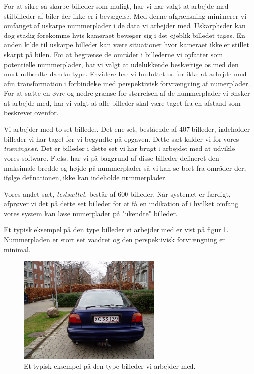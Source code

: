 For at sikre så skarpe billeder som muligt, har vi har valgt at arbejde med stilbilleder af biler der ikke er i bevægelse. Med denne afgrænsning minimerer vi omfanget af uskarpe nummerplader i de data vi arbejder med. Uskarpheder kan dog stadig forekomme hvis kameraet bevæger sig i det øjeblik billedet tages. En anden kilde til uskarpe billeder kan være situationer hvor kameraet ikke er stillet skarpt på bilen. For at begrænse de områder i billederne vi opfatter som potentielle nummerplader, har vi valgt at udelukkende beskæftige os med den mest udbredte danske type. Envidere har vi besluttet os for ikke at arbejde med afin transformation i forbindelse med perspektivisk forvrængning af numerplader. For at sætte en øvre og nedre grænse for størrelsen af de nummerplader vi ønsker at arbejde med, har vi valgt at alle billeder skal være taget fra en afstand som beskrevet ovenfor. 

Vi arbejder med to set billeder. Det ene set, bestående af 407 billeder, indeholder billeder vi har taget før vi begyndte på opgaven. Dette sæt kalder vi for vores \textit{træningsæt}. Det er billeder i dette set vi har brugt i arbejdet med at udvikle vores software. F.eks. har vi på baggrund af disse billeder defineret den maksimale bredde og højde på nummerplader så vi kan se bort fra områder der, ifølge definationen, ikke kan indeholde nummerplader.

Vores andet sæt, \textit{testsættet}, består af 600  billeder. Når systemet er færdigt, afprøver vi det på dette set billeder for at få en indikation af i hvilket omfang vores system kan læse numerplader på "ukendte" billeder.

Et typisk eksempel på den type billeder vi arbejder med er vist på figur \ref{fig:typisk_billede}. Nummerpladen er stort set vandret og den perspektivisk forvrængning er minimal.

\begin{figure}[htp]
\centering
\includegraphics[width=7cm]{illu/B_XC33139.jpg} 
\caption{Et typisk eksempel på den type billeder vi arbejder med.}
\label{fig:typisk_billede}
\end{figure}

